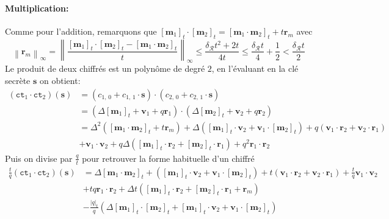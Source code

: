 \documentclass[11pt, headsepline, a4paper, fleqn, oneside]{article}
\begin{document}
\paragraph{Multiplication:} Comme pour l'addition, remarquons que $\left[\boldsymbol{m}_{1}\right]_{t}\cdot\left[\boldsymbol{m}_{2}\right]_{t}=\left[\boldsymbol{m}_{1} \cdot \boldsymbol{m}_{2}\right]_{t}+t \boldsymbol{r}_{m}$ avec
$$\left\|\boldsymbol{r}_{m}\right\|_{\infty}=\left\|\frac{[\boldsymbol{m}_{1}]_{t} \cdot\left[\boldsymbol{m}_{2}\right]_{t}-\left[\boldsymbol{m}_{1} \cdot \boldsymbol{m}_{2}\right]_{t}}{t}\right\|_{\infty} \leq \frac{\delta_{\mathcal{R}} t^{2}+2 t}{4 t} \leq \frac{\delta_{\mathcal{R}} t}{4}+\frac{1}{2}<\frac{\delta_{\mathcal{R}} t}{2}$$
Le produit de deux chiffrés est un polynôme de degré $2$, en l'évaluant en la clé secrète $\boldsymbol{s}$ on obtient: $$\begin{aligned}\left(\texttt{ct}_{1} \cdot \texttt{ct}_{2}\right)(\boldsymbol{s}) &= \left(c_{1,\,0}+c_{1,\,1} \cdot \boldsymbol{s}\right) \cdot\left(c_{2,\,0}+c_{2,\,1} \cdot \boldsymbol{s}\right) \\&=\left(\Delta[\boldsymbol{m}_{1}]_{t}+\boldsymbol{v}_{1}+q \boldsymbol{r}_{1}\right) \cdot\left(\Delta\left[\boldsymbol{m}_{2}\right]_{t}+\boldsymbol{v}_{2}+q \boldsymbol{r}_{2}\right) \\&= \Delta^{2}\left(\left[\boldsymbol{m}_{1} \cdot \boldsymbol{m}_{2}\right]_{t}+t \boldsymbol{r}_{m}\right)+\Delta\left([\boldsymbol{m}_{1}]_{t} \cdot \boldsymbol{v}_{2}+\boldsymbol{v}_{1} \cdot\left[\boldsymbol{m}_{2}\right]_{t}\right)+q\left(\boldsymbol{v}_{1} \cdot \boldsymbol{r}_{2}+\boldsymbol{v}_{2} \cdot \boldsymbol{r}_{1}\right) \\&+\boldsymbol{v}_{1} \cdot \boldsymbol{v}_{2}
+q \Delta\left([\boldsymbol{m}_{1}]_{t} \cdot \boldsymbol{r}_{2}+\left[\boldsymbol{m}_{2}\right]_{t} \cdot \boldsymbol{r}_{1}\right)+q^{2} \boldsymbol{r}_{1} \cdot \boldsymbol{r}_{2}
\end{aligned}$$
Puis on divise par $\frac{q}{t}$ pour retrouver la forme habituelle d'un chiffré
$$\begin{aligned}\frac{t}{q}\left(\texttt{ct}_{1} \cdot \texttt{ct}_{2}\right)(\boldsymbol{s}) &= \Delta\left[\boldsymbol{m}_{1} \cdot \boldsymbol{m}_{2}\right]_{t}+\left(\left[\boldsymbol{m}_{1}\right]_{t} \cdot \boldsymbol{v}_{2}+\boldsymbol{v}_{1} \cdot\left[\boldsymbol{m}_{2}\right]_{t}\right)+t\left(\boldsymbol{v}_{1} \cdot \boldsymbol{r}_{2}+\boldsymbol{v}_{2} \cdot \boldsymbol{r}_{1}\right) +\frac{t}{q}\boldsymbol{v}_{1} \cdot \boldsymbol{v}_{2} \\&+t q \boldsymbol{r}_{1} \cdot \boldsymbol{r}_{2}+\Delta t\left(\left[\boldsymbol{m}_{1}\right]_{t} \cdot \boldsymbol{r}_{2}+\left[\boldsymbol{m}_{2}\right]_{t} \cdot \boldsymbol{r}_{1} + \boldsymbol{r}_{m}\right)\\&-\frac{|q|_{t}}{q}\left(\Delta\left[\boldsymbol{m}_{1}\right]_{t} \cdot\left[\boldsymbol{m}_{2}\right]_{t}+\left[\boldsymbol{m}_{1}\right]_{t} \cdot \boldsymbol{v}_{2}+\boldsymbol{v}_{1} \cdot\left[\boldsymbol{m}_{2}\right]_{t}\right)
\end{aligned}$$
\end{document}

